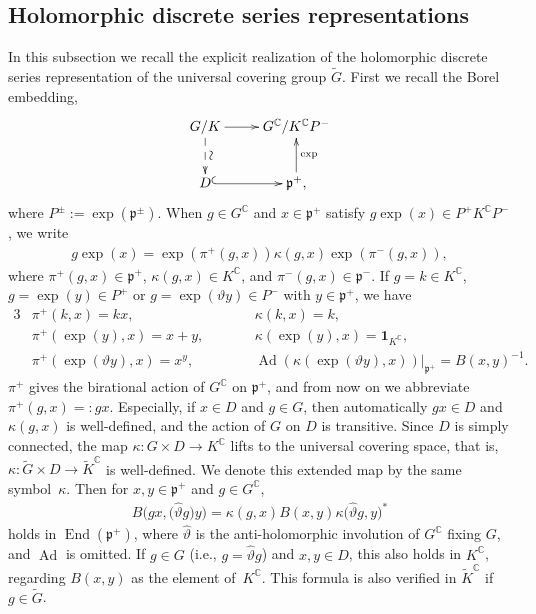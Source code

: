 \documentclass[11pt]{article}
\numberwithin{equation}{section}
\newcommand{\bone}{\mathbf{1}}
\newcommand{\BC}{\mathbb{C}}
\newcommand{\fp}{\mathfrak{p}}
\newcommand{\End}{\operatorname{End}}
\begin{document}
\subsection{Holomorphic discrete series representations}\label{HDS}
In this subsection we recall the explicit realization of the holomorphic discrete series representation
of the universal covering group $\tilde{G}$. First we recall the Borel embedding,
\begin{gather*} \xymatrix{ G/K \ar[r] \ar@{-->}[d]^{\mbox{\rotatebox{90}{$\sim$}}} & G^\BC/K^\BC P^- \\
 D \ar@{^{(}->}[r] & \fp^+, \ar[u]_{\exp} } \end{gather*}
where $P^\pm:=\exp(\fp^\pm)$. When $g\in G^\BC$ and $x\in \fp^+$ satisfy $g\exp(x)\in P^+K^\BC P^-$, we write
\begin{gather}\label{cocycle}
g\exp(x)=\exp(\pi^+(g,x))\kappa(g,x)\exp(\pi^-(g,x)),
\end{gather}
where $\pi^+(g,x)\in\fp^+$, $\kappa(g,x)\in K^\BC$, and $\pi^-(g,x)\in\fp^-$.
If $g=k\in K^\BC$, $g=\exp(y)\in P^+$ or $g=\exp(\vartheta y)\in P^-$ with $y\in\fp^+$, we have
\begin{alignat*}{3}
&\pi^+(k,x)=kx,\qquad && \kappa(k,x)=k,&\\
& \pi^+(\exp(y),x)=x+y,\qquad && \kappa(\exp(y),x) =\bone_{K^\BC},& \\
& \pi^+(\exp(\vartheta y),x) =x^y,\qquad && \operatorname{Ad}(\kappa(\exp(\vartheta y),x))|_{\fp^+}=B(x,y)^{-1}.&
\end{alignat*}
$\pi^+$ gives the birational action of $G^\BC$ on $\fp^+$, and from now on we abbreviate $\pi^+(g,x)=:gx$.
Especially, if $x\in D$ and $g\in G$, then automatically $gx\in D$ and $\kappa(g,x)$ is well-defined,
and the action of $G$ on $D$ is transitive. Since $D$ is simply connected, the map $\kappa\colon G\times D\to K^\BC$
lifts to the universal covering space, that is, $\kappa\colon \tilde{G}\times D\to \tilde{K}^\BC$ is well-defined.
We denote this extended map by the same symbol~$\kappa$. Then for $x,y\in\fp^+$ and $g\in G^\BC$,
\begin{gather}\label{Bergman_property}
B\big(gx,\big(\hat{\vartheta}g\big)y\big)=\kappa(g,x)B(x,y)\kappa\big(\hat{\vartheta}g,y\big)^*
\end{gather}
holds in $\End(\fp^+)$, where $\hat{\vartheta}$ is the anti-holomorphic involution of $G^\BC$ fixing $G$, and $\operatorname{Ad}$ is omitted.
If $g\in G$ (i.e., $g=\hat{\vartheta}g$) and $x,y\in D$, this also holds in $K^\BC$, regarding $B(x,y)$ as the element of~$K^\BC$.
This formula is also verified in $\tilde{K}^\BC$ if $g\in \tilde{G}$.
\end{document}
